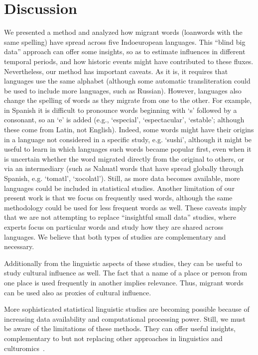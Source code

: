 \documentclass[10pt,letterpaper]{article} %
\begin{document}

\section*{Discussion} %

We presented a method and analyzed how migrant words (loanwords with the same spelling) have spread across five Indoeuropean languages. This ``blind big data'' approach can offer some insights, so as to estimate influences in different temporal periods, and how historic events might have contributed to these fluxes. Nevertheless, our method has important caveats. As it is, it requires that languages use the same alphabet (although some automatic transliteration could be used to include more languages, such as Russian). However, languages also change the spelling of words as they migrate from one to the other. For example, in Spanish it is difficult to pronounce words beginning with `s' followed by a consonant, so an `e' is added (e.g., `especial', `espectacular', `estable'; although these come from Latin, not English). Indeed, some words might have their origins in a language not considered in a specific study, e.g. `sushi', although it might be useful to learn in which languages such words became popular first, even when it is uncertain whether the word migrated directly from the original to others, or via an intermediary (such as Nahuatl words that have spread globally through Spanish, e.g. `tomatl', `xocolatl'). Still, as more data becomes available, more languages could be included in statistical studies. Another limitation of our present work is that we focus on frequently used words, although the same methodology could be used for less frequent words as well. These caveats imply that we are not attempting to replace ``insightful small data'' studies, where experts focus on particular words and study how they are shared across languages. We believe that both types of studies are complementary and necessary.

Additionally from the linguistic aspects of these studies, they can be useful to study cultural influence as well. The fact that a name of a place or person from one place is used frequently in another implies relevance. Thus, migrant words can be used also as proxies of cultural influence.

More sophisticated statistical linguistic studies are becoming possible because of increasing data availability and computational processing power. Still, we must be aware of the limitations of these methods. They can offer useful insights, complementary to but not replacing other approaches in linguistics and culturomics~\cite{Michel14012011,doi:10.1073/pnas.2102061118}.
\end{document}
